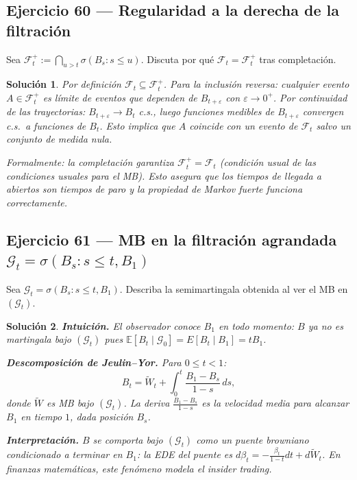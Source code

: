 \documentclass[12pt,letterpaper]{article}
\theoremstyle{ejercicio}
\theoremstyle{solucion}
\newtheorem*{solucion}{Solución}
\newcommand{\E}{\mathbb{E}}
\newcommand{\F}{\mathcal{F}}
\begin{document}
\subsection*{Ejercicio 60 — Regularidad a la derecha de la filtración}

\begin{recuadro}
Sea $\F_t^+:=\bigcap_{u>t}\sigma(B_s:s\le u)$. Discuta por qué $\F_t=\F_t^+$ tras completación.
\end{recuadro}

\begin{solucion}
Por definición $\F_t\subseteq\F_t^+$. Para la inclusión reversa: cualquier evento
$A\in\F_t^+$ es límite de eventos que dependen de $B_{t+\varepsilon}$ con $\varepsilon\to 0^+$.
Por continuidad de las trayectorias: $B_{t+\varepsilon}\to B_t$ c.s., luego funciones medibles de
$B_{t+\varepsilon}$ convergen c.s.\ a funciones de $B_t$. Esto implica que $A$ coincide con un
evento de $\F_t$ salvo un conjunto de medida nula.

Formalmente: la completación garantiza $\F_t^+=\F_t$ (condición usual de las condiciones usuales
para el MB). Esto asegura que los tiempos de llegada a abiertos son tiempos de paro y la
propiedad de Markov fuerte funciona correctamente.
\end{solucion}

\subsection*{Ejercicio 61 — MB en la filtración agrandada $\mathcal{G}_t=\sigma(B_s:s\le t,B_1)$}

\begin{recuadro}
Sea $\mathcal{G}_t=\sigma(B_s:s\le t,B_1)$. Describa la semimartingala obtenida al ver
el MB en $(\mathcal{G}_t)$.
\end{recuadro}

\begin{solucion}
\textbf{Intuición.} El observador conoce $B_1$ en todo momento: $B$ ya no es martingala bajo
$(\mathcal{G}_t)$ pues $\E[B_t\mid\mathcal{G}_0]=E[B_t\mid B_1]=tB_1$.

\textbf{Descomposición de Jeulin--Yor.} Para $0\le t<1$:
\[
  B_t=\tilde W_t+\int_0^t\frac{B_1-B_s}{1-s}\,ds,
\]
donde $\tilde W$ es MB bajo $(\mathcal{G}_t)$. La deriva $\frac{B_1-B_s}{1-s}$ es la velocidad
media para alcanzar $B_1$ en tiempo $1$, dada posición $B_s$.

\textbf{Interpretación.} $B$ se comporta bajo $(\mathcal{G}_t)$ como un puente browniano
condicionado a terminar en $B_1$: la EDE del puente es $d\beta_t=-\frac{\beta_t}{1-t}dt+d\tilde W_t$.
En finanzas matemáticas, este fenómeno modela el insider trading.
\end{solucion}

\end{document}
